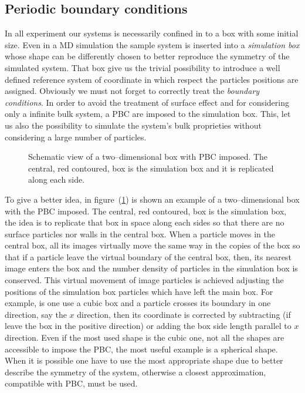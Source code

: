 \subsection{Periodic boundary conditions}
In all experiment our systems is necessarily confined in to a box with some initial size. Even in a \ac{MD} simulation the sample system is inserted into a \textit{simulation box} whose shape can be differently chosen to better reproduce the symmetry of the simulated system. That box give us the trivial possibility to introduce a well defined reference system of coordinate in which respect the particles positions are assigned. Obviously we must not forget to correctly treat the \textit{boundary conditions}. In order to avoid the treatment of surface effect and for considering only a infinite bulk system, a \ac{PBC} are imposed to the simulation box. This, let us also the possibility to simulate the system's bulk proprieties without considering a large number of particles.
\begin{figure}
\caption{Schematic view of a two--dimensional box with \acs{PBC} imposed. The central, red contoured, box is the simulation box and it is replicated along each side.}
\label{fig:pbc}
\end{figure}
To give a better idea, in figure~(\ref{fig:pbc}) is shown an example of a two--dimensional box with the \ac{PBC} imposed. The central, red contoured, box is the simulation box, the idea is to replicate that box in space along each sides so that there are no surface particles nor walls in the central box. When a particle moves in the central box, all its images virtually move the same way in the copies of the box so that if a particle leave the virtual boundary of the central box, then, its nearest image enters the box and the number density of particles in the simulation box is conserved. This virtual movement of image particles is achieved adjusting the positions of the simulation box particles which have left the main box. For example, is one use a cubic box and a particle crosses its boundary in one direction, say the $x$ direction, then its coordinate is corrected by subtracting (if leave the box in the positive direction) or adding the box side length parallel to $x$ direction. Even if the most used shape is the cubic one, not all the shapes are accessible to impose the \ac{PBC}, the most useful example is a spherical shape. When it is possible one have to use the most appropriate shape due to better describe the symmetry of the system, otherwise a closest approximation, compatible with \ac{PBC}, must be used.

